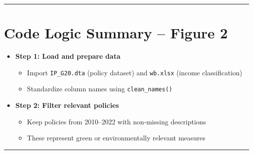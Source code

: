 \documentclass[
  letterpaper,
  DIV=11,
  numbers=noendperiod]{scrartcl}
\providecommand{\tightlist}{%
  \setlength{\itemsep}{0pt}\setlength{\parskip}{0pt}}
\begin{document}
\begin{center}\rule{0.5\linewidth}{0.5pt}\end{center}

\section{\texorpdfstring{\textbf{Code Logic Summary -- Figure
2}}{Code Logic Summary -- Figure 2}}\label{code-logic-summary-figure-2}

\begin{itemize}
\item
  \textbf{Step 1: Load and prepare data}

  \begin{itemize}
  \tightlist
  \item
    Import \texttt{IP\_G20.dta} (policy dataset) and \texttt{wb.xlsx}
    (income classification)
  \item
    Standardize column names using \texttt{clean\_names()}
  \end{itemize}
\item
  \textbf{Step 2: Filter relevant policies}

  \begin{itemize}
  \tightlist
  \item
    Keep policies from 2010--2022 with non-missing descriptions
  \item
    These represent green or environmentally relevant measures
  \end{itemize}
\end{itemize}

\begin{center}\rule{0.5\linewidth}{0.5pt}\end{center}
\end{document}
